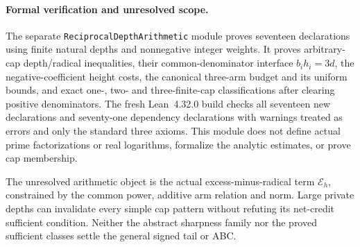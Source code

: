 \paragraph{Formal verification and unresolved scope.}
The separate \texttt{ReciprocalDepthArithmetic} module proves seventeen
declarations using finite natural depths and nonnegative integer
weights. It proves arbitrary-cap depth/radical inequalities, their
common-denominator interface $b_ih_i=3d$, the negative-coefficient
height costs, the canonical three-arm budget and its uniform bounds,
and exact one-, two- and three-finite-cap classifications after
clearing positive denominators. The fresh Lean~4.32.0 build checks all
seventeen new declarations and seventy-one dependency declarations
with warnings treated as errors and only the standard three axioms.
This module does not define actual prime factorizations or real
logarithms, formalize the analytic estimates, or prove cap membership.

The unresolved arithmetic object is the actual excess-minus-radical
term $\mathcal E_h$, constrained by the common power, additive arm
relation and norm. Large private depths can invalidate every simple
cap pattern without refuting its net-credit sufficient condition.
Neither the abstract sharpness family nor the proved sufficient
classes settle the general signed tail or ABC.
